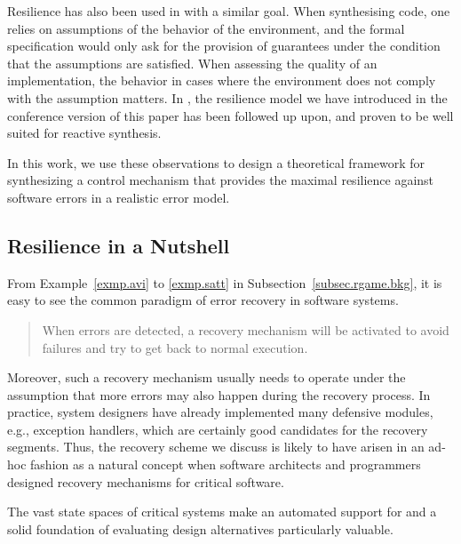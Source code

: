 \documentclass[times,10pt,twocolumn]{article}
\begin{document}
Resilience has also been used in \cite{EhlersT14,BloemEJK14} with a similar goal.
When synthesising code, one relies on assumptions of the behavior of the environment, and the formal specification\label{reply1.speicification} would only ask for the provision of guarantees under the condition that the assumptions are satisfied.
When assessing the quality of an implementation, the behavior in cases\label{reply1.cases.comma} where the environment does not comply with the assumption matters.
In \cite{EhlersT14,BloemEJK14}, the resilience model we have introduced in the conference version \cite{HPSW/12/rapidRecovery} 
of this paper\label{reply1.of.this.paper}
has been followed up upon, and proven to be well suited for reactive synthesis.

In this work, we use these observations to design \label{reply1.theoretical.framework.eval} 
a theoretical framework for synthesizing a control mechanism that provides 
the maximal resilience against software errors in a realistic error model. 



\subsection{Resilience in a Nutshell\label{subsec.ideas}} 

\label{reply2.from.the.examples} 
From Example~\ref{exmp.avi} to \ref{exmp.satt} in 
Subsection~\ref{subsec.rgame.bkg}, it is easy to see 
the common paradigm of error recovery in software systems.  

\begin{quote}
When errors are detected, a recovery mechanism will be activated
to avoid failures and try to get back to normal execution. 
\end{quote}

Moreover, \label{reply1.a.recovery.the.assumption}
such a recovery mechanism usually needs to operate under the assumption 
that more errors may also happen during the recovery process. In practice, system designers have already implemented many defensive modules, 
e.g., exception handlers, which are certainly good candidates for the recovery segments.  
Thus, the recovery scheme we discuss is likely to have arisen in an ad-hoc fashion as a natural concept when software architects and programmers designed recovery mechanisms for critical software.  

The vast state spaces of critical systems make an automated support for and a solid foundation 
of evaluating design alternatives particularly valuable. 
\end{document}
